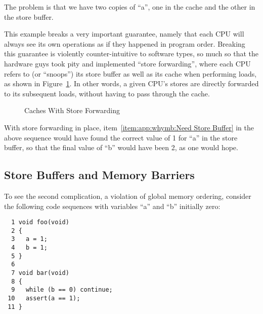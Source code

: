 The problem is that we have two copies of ``a'', one in the cache and
the other in the store buffer.

This example breaks a very important guarantee, namely that each CPU
will always see its own operations as if they happened in program order.
Breaking this guarantee is violently counter-intuitive to software types,
so much so
that the hardware guys took pity and implemented ``store forwarding'',
where each CPU refers to (or ``snoops'') its store buffer as well
as its cache when performing loads, as shown in
Figure~\ref{fig:app:whymb:Caches With Store Forwarding}.
In other words, a given CPU's stores are directly forwarded to its
subsequent loads, without having to pass through the cache.

\begin{figure}[htb]
\centering
{}
\caption{Caches With Store Forwarding}
\label{fig:app:whymb:Caches With Store Forwarding}
\end{figure}

With store forwarding in place, item~\ref{item:app:whymb:Need Store Buffer}
in the above sequence would have found the correct value of 1 for ``a'' in
the store buffer, so that the final value of ``b'' would have been 2,
as one would hope.

\subsection{Store Buffers and Memory Barriers}
\label{sec:app:whymb:Store Buffers and Memory Barriers}

To see the second complication, a violation of global memory ordering,
consider the following code sequences
with variables ``a'' and ``b'' initially zero:

\vspace{5pt}
\begin{minipage}[t]{\columnwidth}
\small
\begin{verbatim}
  1 void foo(void)
  2 {
  3   a = 1;
  4   b = 1;
  5 }
  6
  7 void bar(void)
  8 {
  9   while (b == 0) continue;
 10   assert(a == 1);
 11 }
\end{verbatim}
\end{minipage}
\vspace{5pt}

